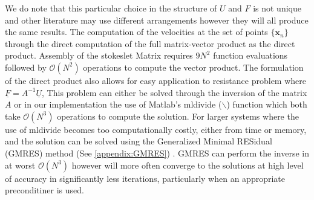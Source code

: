 We do note that this particular choice in the structure of $U$ and $F$ is not unique and other literature may use different arrangements however they will all produce the same results. The computation of the velocities at the set of points $\{\bm{x}_n\}$ through the direct computation of the full matrix-vector product as the direct product. Assembly of the stokeslet Matrix requires $9N^2$ function evaluations followed by $\mathcal{O}(N^2)$ operations to compute the vector product. The formulation of the direct product also allows for easy application to resistance problem where $\underline{F} = A^{-1} \underline{U}$, This problem can either be solved through the inversion of the matrix $A$ or in our implementation the use of Matlab's mldivide ($\backslash$) function which both take $\mathcal{O}(N^3)$ operations to compute the solution. For larger systems where the use of mldivide becomes too computationally costly, either from time or memory, and the solution can be solved using the Generalized Minimal RESidual (GMRES) method (See \cref{appendix:GMRES}) \cite{Saad1986GMRES:Systems,Elman2005FiniteDynamics}. GMRES can perform the inverse in at worst $\mathcal{O}(N^3)$ however will more often converge to the solutions at high level of accuracy in significantly less iterations, particularly when an appropriate preconditiner is used.